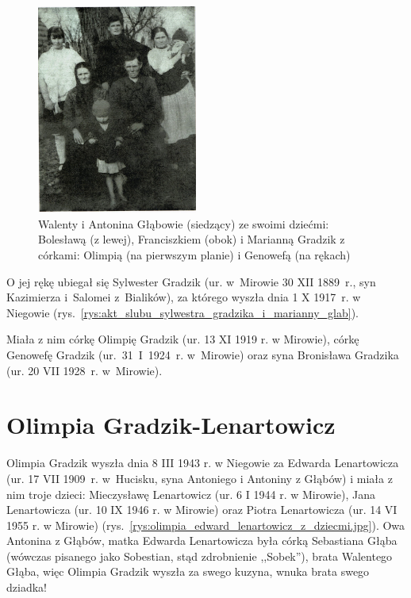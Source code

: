 \begin{figure}[!hb]
\begin{center}
\includegraphics[width=0.47\textwidth]{zdjecia/walenty_antonina_marianna_olimpia.jpg}
\caption[Walenty i Antonina Głąbowie z dziećmi: Bolesławą, Franciszkiem i Marianną Gradzik z córkami: Olimpią i Genowefą]{Walenty i Antonina Głąbowie (siedzący) ze swoimi dziećmi: Bolesławą (z lewej), Franciszkiem (obok) i Marianną Gradzik z córkami: Olimpią (na pierwszym planie) i Genowefą (na rękach)}
\label{rys:walenty_antonina_marianna_olimpia}
\end{center}
\end{figure}

O jej rękę ubiegał się Sylwester Gradzik (ur. w~Mirowie 30 XII 1889~r., syn Kazimierza i~Salomei z~Bialików), za którego wyszła dnia 1 X 1917~r. w Niegowie (rys.~\ref{rys:akt_slubu_sylwestra_gradzika_i_marianny_glab}).

Miała z nim córkę Olimpię Gradzik (ur. 13 XI 1919 r. w Mirowie), córkę Genowefę Gradzik (ur.~31~I~1924~r. w~Mirowie) oraz syna Bronisława Gradzika (ur. 20 VII 1928~r. w~Mirowie).

\section{Olimpia Gradzik-Lenartowicz}
Olimpia Gradzik wyszła dnia 8 III 1943 r. w Niegowie za Edwarda Lenartowicza (ur. 17 VII 1909~r. w~Hucisku, syna Antoniego i Antoniny z Głąbów) i miała z nim troje dzieci: Mieczysławę Lenartowicz (ur. 6 I 1944 r. w Mirowie), Jana Lenartowicza (ur. 10 IX 1946 r. w Mirowie) oraz Piotra Lenartowicza (ur. 14 VI  1955 r. w Mirowie) (rys.~\ref{rys:olimpia_edward_lenartowicz_z_dziecmi.jpg}). Owa Antonina z Głąbów, matka Edwarda Lenartowicza była córką Sebastiana Głąba (wówczas pisanego jako Sobestian, stąd zdrobnienie ,,Sobek''), brata Walentego Głąba, więc Olimpia Gradzik wyszła za swego kuzyna, wnuka brata swego dziadka!

